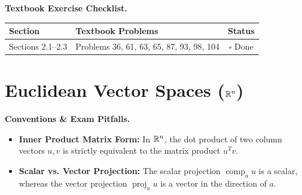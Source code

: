 \documentclass{natsirt}
\newenvironment{warningbox}[1][]{\begin{whitebox}[#1]\textbf{Conventions \& Exam Pitfalls. }}{\end{whitebox}}
\newenvironment{reviewbox}[1][]{\begin{whitebox}[#1]\textbf{Textbook Exercise Checklist. }}{\end{whitebox}}
\newcommand{\citem}{\item[$\square$]}
\newcommand{\proj}{\operatorname{proj}}
\begin{document}
\begin{reviewbox}
    \begin{center}
    \begin{tabular}{|l|l|c|}
        \hline
        \textbf{Section} & \textbf{Textbook Problems} & \textbf{Status} \\
        \hline
        Sections 2.1--2.3 & Problems 36, 61, 63, 65, 87, 93, 98, 104 & $\square$ Done \\
        \hline
    \end{tabular}
    \end{center}
\end{reviewbox}


\section{Euclidean Vector Spaces ($\mathbb{R}^n$)}

\begin{warningbox}
    \begin{itemize}
        \citem \textbf{Inner Product Matrix Form:} In $\mathbb{R}^n$, the dot product of two column vectors $u, v$ is strictly equivalent to the matrix product $u^T v$.
        \citem \textbf{Scalar vs. Vector Projection:} The scalar projection $\operatorname{comp}_a u$ is a scalar, whereas the vector projection $\proj_a u$ is a vector in the direction of $a$.
    \end{itemize}
\end{warningbox}
\end{document}

